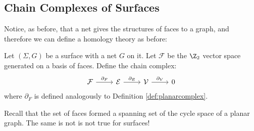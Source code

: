 \subsection{Chain Complexes of Surfaces}
Notice, as before, that a net gives the structures of faces to a graph, and therefore we can define a homology theory as before:
\begin{definition}
Let $(\Sigma, G)$ be a surface with a net $G$ on it. Let $\mathcal F$ be the $\Z_2$ vector space generated on a basis of faces. Define the chain complex: 
\[ \begin{tikzcd}
\mathcal F \arrow{r}{\partial_F} & \mathcal E \arrow{r}{\partial_E} & \mathcal V  \arrow{r}{\partial_V} & 0
\end{tikzcd}\]
where $\partial_F$ is defined analogously to Definition \ref{def:planarcomplex}. \label{def:surfacecomplex}
\end{definition}
Recall that the set of faces formed a spanning set of the cycle space of a planar graph. The same is not is not true for surfaces! \\

